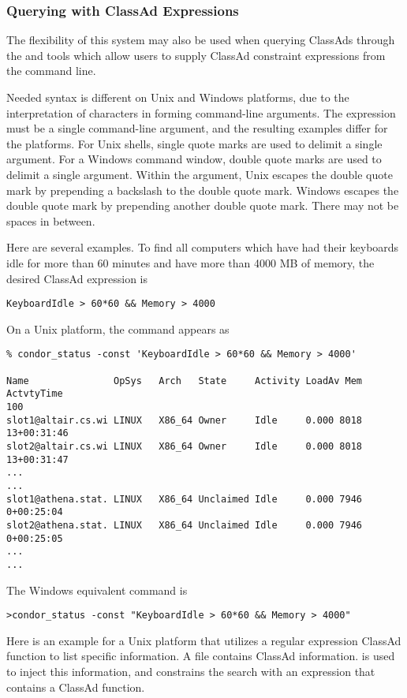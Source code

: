 \subsubsection{\label{sec:classad-query-examples}Querying with ClassAd Expressions}
The flexibility of this system may also be used when querying ClassAds
through the  and  tools which allow users to
supply ClassAd constraint expressions from the command line.

Needed syntax is different on Unix and Windows platforms, 
due to the interpretation of characters in forming command-line arguments.
The expression must be a single command-line argument,
and the resulting examples differ for the platforms.
For Unix shells,
single quote marks are used to delimit a single argument.
For a Windows command window,
double quote marks are used to delimit a single argument.
Within the argument,
Unix escapes the double quote mark by prepending a backslash to the double
quote mark.
Windows escapes the double quote mark by prepending another double
quote mark. There may not be spaces in between.

Here are several examples.
To find all computers which have had their keyboards idle for 
more than 60 minutes and have more than 4000 MB of memory,
the desired ClassAd expression is
\footnotesize
\begin{verbatim}
KeyboardIdle > 60*60 && Memory > 4000
\end{verbatim}
\normalsize
On a Unix platform, the command appears as
\footnotesize
\begin{verbatim}
% condor_status -const 'KeyboardIdle > 60*60 && Memory > 4000'

Name               OpSys   Arch   State     Activity LoadAv Mem  ActvtyTime
100
slot1@altair.cs.wi LINUX   X86_64 Owner     Idle     0.000 8018 13+00:31:46
slot2@altair.cs.wi LINUX   X86_64 Owner     Idle     0.000 8018 13+00:31:47
...
...
slot1@athena.stat. LINUX   X86_64 Unclaimed Idle     0.000 7946  0+00:25:04
slot2@athena.stat. LINUX   X86_64 Unclaimed Idle     0.000 7946  0+00:25:05
...
...
\end{verbatim}
\normalsize

The Windows equivalent command is
\footnotesize
\begin{verbatim}
>condor_status -const "KeyboardIdle > 60*60 && Memory > 4000"
\end{verbatim}
\normalsize

Here is an example for a Unix platform that utilizes a regular expression
ClassAd function to list specific information.
A file contains ClassAd information.
 is used to inject this information,
and  constrains the search with an expression
that contains a ClassAd function.

